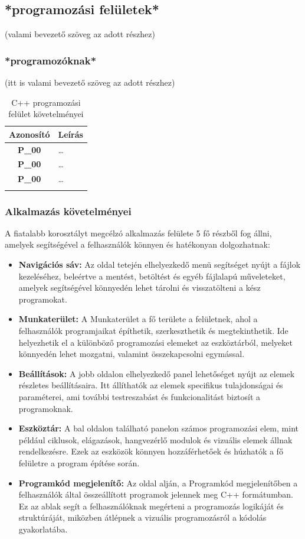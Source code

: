 \documentclass{article}
\begin{document}
\subsection{*programozási felületek*}

(valami bevezető szöveg az adott részhez)

\subsubsection{*programozóknak*}

(itt is valami bevezető szöveg az adott részhez)

\begingroup
\centering
\begin{longtable}{|c|p{14cm}|}
\hline
\textbf{Azonosító} & \textbf{Leírás}        \\ 
\hline
       \textbf{P\_00}  & … \\\hline
       \textbf{P\_00}  & … \\\hline
       \textbf{P\_00}  & … \\\hline
\hline
\caption{C++ programozási felület követelményei}
\end{longtable}
\endgroup


\subsubsection{Alkalmazás követelményei}

A fiatalabb korosztályt megcélzó alkalmazás felülete 5 fő részből fog állni, amelyek segítségével a felhasználók könnyen és hatékonyan dolgozhatnak:

\begin{itemize}
\item \textbf{Navigációs sáv:} 
Az oldal tetején elhelyezkedő menü segítséget nyújt a fájlok kezeléséhez, beleértve a mentést, betöltést és egyéb fájlalapú műveleteket, amelyek segítségével könnyedén lehet tárolni és visszatölteni a kész programokat.
\item \textbf{Munkaterület:}
A Munkaterület a fő területe a felületnek, ahol a felhasználók programjaikat építhetik, szerkeszthetik és megtekinthetik. Ide helyezhetik el a különböző programozási elemeket az eszköztárból, melyeket könnyedén lehet mozgatni, valamint összekapcsolni egymással.
\item \textbf{Beállítások:} 
A jobb oldalon elhelyezkedő panel lehetőséget nyújt az elemek részletes beállításaira. Itt állíthatók az elemek specifikus tulajdonságai és paraméterei, ami további testreszabást és funkcionalitást biztosít a programoknak.
\item \textbf{Eszköztár:}
A bal oldalon található panelon számos programozási elem, mint például ciklusok, elágazások, hangvezérlő modulok és vizuális elemek állnak rendelkezésre. Ezek az eszközök könnyen hozzáférhetőek és húzhatók a fő felületre a program építése során.
\item \textbf{Programkód megjelenítő:}
Az oldal alján, a Programkód megjelenítőben a felhasználók által összeállított programok jelennek meg C++ formátumban. Ez az ablak segít a felhasználóknak megérteni a programozás logikáját és struktúráját, miközben átlépnek a vizuális programozásról a kódolás gyakorlatába.
\end{itemize}
\end{document}
